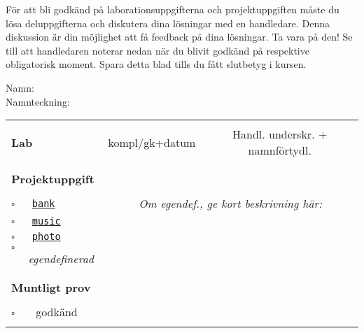 \vspace{1em}\noindent
För att bli godkänd på laborationsuppgifterna och projektuppgiften måste du lösa deluppgifterna och diskutera dina lösningar med en handledare. Denna diskussion är din möjlighet att få feedback på dina lösningar. Ta vara på den!
Se till att handledaren noterar nedan när du blivit godkänd på respektive obligatorisk moment. Spara detta blad tills du fått slutbetyg i kursen.


\vspace{2.2em}\noindent Namn: \dotfill\\

\vspace{1em}\noindent Namnteckning: \dotfill\\

\newcommand{\LabRow}[1]{\\[-1.1em] \hyperref[section:lab:#1]{\texttt{#1}} & \dotfill &  \dotfill  \\[0.7em]}  %

\begin{table}[h]
\vspace{1em}
\begin{tabular}{lcc}
\hline%
\\
{\sffamily\bfseries\small Lab} & {\sffamily\small kompl/gk+datum } &	
{\sffamily\small Handl. underskr. + namnförtydl.}\\ %
\\[-0.5em]

\\ 
{\sffamily\small {\bfseries Projektuppgift}} & \dotfill &  \dotfill  \\
\\
{\Large$\square$}\texttt{~~~\hyperref[section:proj:bank]{bank}} &
\multicolumn{2}{c}{\textit{Om egendef., ge kort beskrivning här:}}  \\[0.6em] %
{\Large$\square$}\texttt{~~~\hyperref[section:proj:music]{music}} \\[0.6em] %
{\Large$\square$}\texttt{~~~\hyperref[section:proj:photo]{photo}}  \\[0.6em] %
{\Large$\square$}\texttt{~~~}\textit{egendefinerad}  \\
\\
\\
{\sffamily\small {\bfseries Muntligt prov}} &  & \\
\\
{\Large$\square$}\texttt{~~~} godkänd & \dotfill &  \dotfill \\
\\\hline%
\end{tabular}
\end{table}
